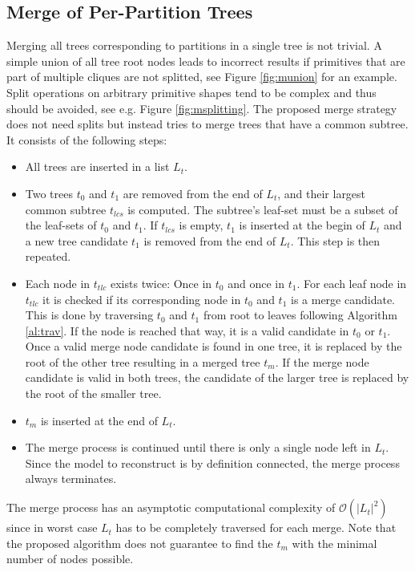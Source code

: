 \subsection{Merge of Per-Partition Trees}
Merging all trees corresponding to partitions in a single tree is not trivial. 
A simple union of all tree root nodes leads to incorrect results if primitives that are part of multiple cliques are not splitted, see Figure \ref{fig:munion} for an example.
Split operations on arbitrary primitive shapes tend to be complex and thus should be avoided, see e.g. Figure \ref{fig:msplitting}.  
The proposed merge strategy does not need splits but instead tries to merge trees that have a common subtree.
It consists of the following steps:
\begin{itemize}
	\item All trees are inserted in a list $L_t$. 
	\item Two trees $t_0$ and $t_1$ are removed from the end of $L_t$, and their largest common subtree $t_{lcs}$ is computed. The subtree's leaf-set must be a subset of the leaf-sets of $t_0$ and $t_1$. 
	If $t_{lcs}$ is empty, $t_1$ is inserted at the begin of $L_t$ and a new tree candidate $t_1$ is removed from the end of $L_t$. This step is then repeated.
	\item Each node in $t_{tlc}$ exists twice: Once in $t_0$ and once in $t_1$. 
	For each leaf node in $t_{tlc}$ it is checked if its corresponding node in $t_0$ and $t_1$ is a merge candidate.
	This is done by traversing $t_0$ and $t_1$ from root to leaves following Algorithm \ref{al:trav}.
	If the node is reached that way, it is a valid candidate in $t_0$ or $t_1$. 
	Once a valid merge node candidate is found in one tree, it is replaced by the root of the other tree resulting in a merged tree $t_m$.
	If the merge node candidate is valid in both trees, the candidate of the larger tree is replaced by the root of the smaller tree. 
	\item $t_m$ is inserted at the end of $L_t$.
	\item The merge process is continued until there is only a single node left in $L_t$.
	Since the model to reconstruct is by definition connected, the merge process always terminates.
\end{itemize}
The merge process has an asymptotic computational complexity of $\mathcal{O}(\vert L_t \vert^2)$ since in worst case $L_t$ has to be completely traversed for each merge.
Note that the proposed algorithm does not guarantee to find the $t_m$ with the minimal number of nodes possible. 

